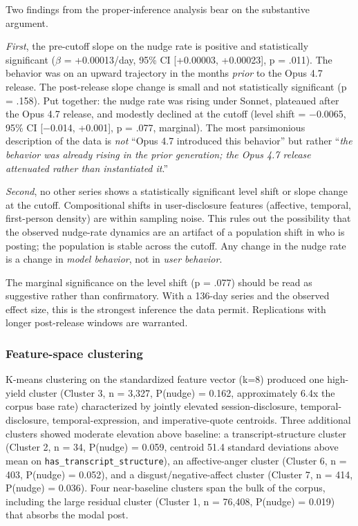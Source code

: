 \documentclass[11pt]{article}
\begin{document}
Two findings from the proper-inference analysis bear on the substantive argument.

\emph{First}, the pre-cutoff slope on the nudge rate is positive and statistically significant ($\beta$ = +0.00013/day, 95\% CI [+0.00003, +0.00023], p = .011). The behavior was on an upward trajectory in the months \emph{prior} to the Opus 4.7 release. The post-release slope change is small and not statistically significant (p = .158). Put together: the nudge rate was rising under Sonnet, plateaued after the Opus 4.7 release, and modestly declined at the cutoff (level shift = $-$0.0065, 95\% CI [$-$0.014, +0.001], p = .077, marginal). The most parsimonious description of the data is \emph{not} ``Opus 4.7 introduced this behavior'' but rather ``\emph{the behavior was already rising in the prior generation; the Opus 4.7 release attenuated rather than instantiated it}.''

\emph{Second}, no other series shows a statistically significant level shift or slope change at the cutoff. Compositional shifts in user-disclosure features (affective, temporal, first-person density) are within sampling noise. This rules out the possibility that the observed nudge-rate dynamics are an artifact of a population shift in who is posting; the population is stable across the cutoff. Any change in the nudge rate is a change in \emph{model behavior}, not in \emph{user behavior}.

The marginal significance on the level shift (p = .077) should be read as suggestive rather than confirmatory. With a 136-day series and the observed effect size, this is the strongest inference the data permit. Replications with longer post-release windows are warranted.

\subsubsection{Feature-space clustering}

K-means clustering on the standardized feature vector (k=8) produced one high-yield cluster (Cluster 3, n = 3,327, P(nudge) = 0.162, approximately 6.4x the corpus base rate) characterized by jointly elevated session-disclosure, temporal-disclosure, temporal-expression, and imperative-quote centroids. Three additional clusters showed moderate elevation above baseline: a transcript-structure cluster (Cluster 2, n = 34, P(nudge) = 0.059, centroid 51.4 standard deviations above mean on \texttt{has\_transcript\_structure}), an affective-anger cluster (Cluster 6, n = 403, P(nudge) = 0.052), and a disgust/negative-affect cluster (Cluster 7, n = 414, P(nudge) = 0.036). Four near-baseline clusters span the bulk of the corpus, including the large residual cluster (Cluster 1, n = 76,408, P(nudge) = 0.019) that absorbs the modal post.
\end{document}
